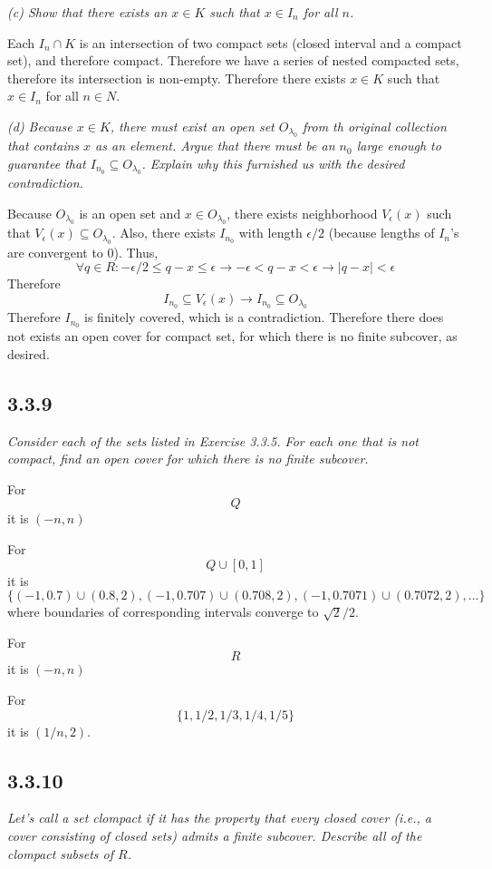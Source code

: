 \documentclass[11pt,oneside,titlepage]{book}
\begin{document}
\textit{(c) Show that there exists an $x \in K$ such that $x \in I_n$ for all
  $n$.}

Each $I_n \cap K$ is an intersection of two compact sets (closed interval and
a compact set), and therefore compact. Therefore we have a series of nested
compacted sets, therefore its intersection is non-empty. Therefore there exists
$x \in K$ such that  $x \in I_n$  for all $n \in N$.

\textit{(d) Because $x \in K$, there must exist an open set $O_{\lambda_0}$
  from th original collection that contains $x$ as an element. Argue that
  there must be an $n_0$ large enough to guarantee  that
  $I_{n_0} \subseteq O_{\lambda_0}$. Explain why this furnished us with the
  desired contradiction.}

Because $O_{\lambda_0}$ is an open set and $x \in O_{\lambda_0}$, there exists
neighborhood $V_\epsilon(x)$ such that $V_\epsilon(x) \subseteq O_{\lambda_0}$.
Also, there exists $I_{n_0}$ with length $\epsilon / 2$ (because lengths of
$I_n$'s are convergent to 0). Thus,
$$ \forall q \in R:  -\epsilon / 2 \leq q - x \leq \epsilon \to
-\epsilon < q - x < \epsilon \to |q - x| < \epsilon$$
Therefore
$$I_{n_0} \subseteq V_\epsilon(x) \to I_{n_0} \subseteq O_{\lambda_0}$$
Therefore $I_{n_0}$ is finitely covered, which is a contradiction. Therefore
there does not exists an open cover for compact set, for which there is no
finite subcover, as desired.

\subsection*{3.3.9}
\textit{Consider each of the sets listed in Exercise 3.3.5. For each one that
  is not compact, find an open cover for which there is no finite subcover.}

For 
$$Q$$
it is $(-n, n)$

For
$$Q \cup [0,1]$$
it is $\{(-1, 0.7) \cup (0.8, 2), (-1, 0.707) \cup
(0.708, 2), (-1, 0.7071) \cup (0.7072, 2), ...\}$ where
boundaries of corresponding intervals converge to
$\sqrt{2}/2$.

For
$$R$$
it is $(-n, n)$

For
$$\{1, 1/2, 1/3, 1/4, 1/5\}$$
it is $(1/n, 2)$.

\subsection*{3.3.10}
\textit{Let's call a set clompact if it has the property that every closed
  cover (i.e., a cover consisting of closed sets) admits a finite subcover.
  Describe all of the clompact subsets of $R$.}
\end{document}
